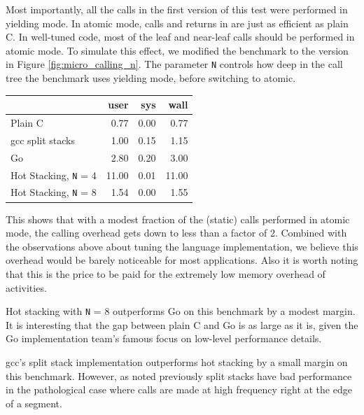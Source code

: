 \documentclass[acmsmall,anonymous,review]{acmart}\settopmatter{printfolios=true,printccs=false,printacmref=false}
\begin{document}
Most importantly, all the calls in the first version of this test were performed in yielding mode.
In atomic mode, calls and returns in \charcoal{} are just as efficient as plain C.
In well-tuned \charcoal{} code, most of the leaf and near-leaf calls should be performed in atomic mode.
To simulate this effect, we modified the benchmark to the version in Figure \ref{fig:micro_calling_n}.
The parameter \texttt{N} controls how deep in the call tree the benchmark uses yielding mode, before switching to atomic.

\vspace{1em}
\begin{tabular}{|l|r|r|r|}
  \hline
   & user & sys & wall \\
  \hline
  \hline
  Plain C & 0.77 & 0.00 & 0.77 \\
  \hline
  gcc split stacks\footnotemark{} & 1.00 & 0.15 & 1.15 \\
  \hline
  Go & 2.80 & 0.20 & 3.00 \\
  \hline
  Hot Stacking, \texttt{N} = 4 & 11.00 & 0.01 & 11.00 \\
  \hline
  Hot Stacking, \texttt{N} = 8 & 1.54 & 0.00 & 1.55 \\
  \hline
\end{tabular}
\vspace{1em}


This shows that with a modest fraction of the (static) calls performed in atomic mode, the calling overhead gets down to less than a factor of 2.
Combined with the observations above about tuning the language implementation, we believe this overhead would be barely noticeable for most applications.
Also it is worth noting that this is the price to be paid for the extremely low memory overhead of activities.

Hot stacking with \texttt{N} = 8 outperforms Go on this benchmark by a modest margin.
It is interesting that the gap between plain C and Go is as large as it is, given the Go implementation team's famous focus on low-level performance details.

gcc's split stack implementation outperforms hot stacking by a small margin on this benchmark.
However, as noted previously split stacks have bad performance in the pathological case where calls are made at high frequency right at the edge of a segment.
\end{document}
